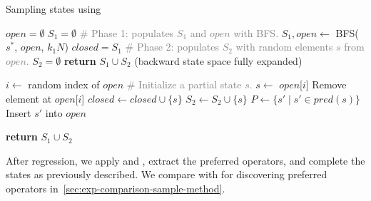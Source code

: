 \documentclass[ppgc,diss,english]{iiufrgs}
\begin{document}
\begin{algorithm}[tb]
\caption{Sampling states using \bfsrs}
\label{alg:sampling-po}
\begin{algorithmic}[1]
  \State $open = \emptyset$
  \State $S_{1} = \emptyset$
  \State \textcolor{gray}{\# Phase 1: populates $S_{1}$ and $open$ with BFS.}
  \State $S_{1}, open \gets$ BFS($s^{*}$, $open$, $k_1N$)
  \State $closed = S_{1}$
  \State \textcolor{gray}{\# Phase 2: populates $S_{2}$ with random elements $s$ from $open$.}
  \State $S_{2} = \emptyset$
      \State \textbf{return} $S_{1} \cup S_{2}$ (backward state space fully expanded)
    \EndIf

    \State $i \gets$ random index of $open$
    \State \textcolor{gray}{\# Initialize a partial state $s$.}
    \State $s \gets$ $open$[$i$]
    \State Remove element at $open$[$i$]
    \State $closed \gets closed \cup \{s\}$
    \State $S_{2} \gets S_{2} \cup \{s\}$
    \State $P \gets \{s' \mid s' \in pred(s)\}$
        \State Insert $s'$ into $open$
      \EndIf
    \EndFor
  \EndWhile

  \State \textbf{return} $S_{1} \cup S_{2}$
\EndProcedure
\end{algorithmic}
\end{algorithm}

%
%

After regression, we apply \sai and \sui, extract the preferred operators, and complete the states as previously described. We compare \bfsrs with \bfsrw for discovering preferred operators in~\cref{sec:exp-comparison-sample-method}.
\end{document}
